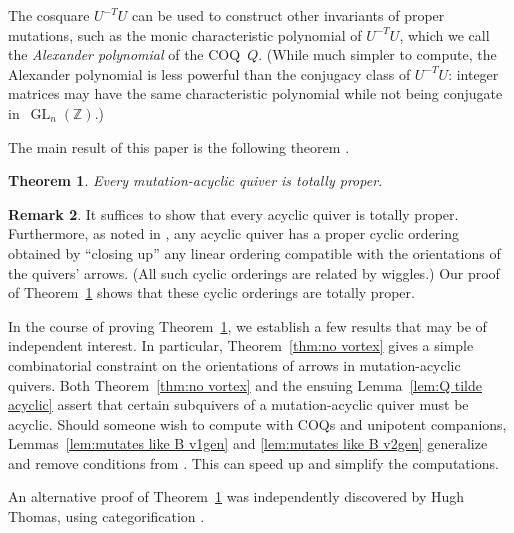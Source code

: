 \documentclass[11pt, letterpaper]{amsart}
\newtheorem{theorem}{Theorem}[section]
\theoremstyle{definition}
\newtheorem{remark}[theorem]{Remark}
\numberwithin{equation}{section}
\def\ZZ{{\mathbb Z}}
\def\GL{{\operatorname{GL}}}
\begin{document}
The cosquare $U^{-T} U$ can be used to construct other invariants of proper mutations, 
such as the monic characteristic polynomial of $U^{-T} U$, 
which we call the \emph{Alexander polynomial} of the COQ~$Q$.
(While much simpler to compute, the Alexander polynomial is less powerful
than the conjugacy class of $U^{-T} U$:
integer matrices may have the same characteristic polynomial while 
not being conjugate in~$\GL_n(\ZZ)$.) 

\pagebreak[2]

The main result of this paper is the following theorem \cite[Conjecture~15.9]{COQ}. %
\begin{theorem}
\label{thm:acyclic totally proper}
Every mutation-acyclic quiver is totally proper. %
\end{theorem}

\begin{remark}
\label{rem:the order}
It suffices to show that every acyclic quiver is totally proper.
Further\-more, as noted in {\cite[Observation~11.6]{COQ}}, any acyclic quiver has a proper cyclic ordering 
obtained by ``closing up'' any linear ordering compatible with the orientations of the quivers' arrows.
(All such cyclic orderings are related by wiggles.)
Our proof of Theorem~\ref{thm:acyclic totally proper} shows that these cyclic orderings are totally proper.
\end{remark}

In the course of proving Theorem~\ref{thm:acyclic totally proper},
we establish a few results that may be of independent interest.
In particular, Theorem~\ref{thm:no vortex} gives a simple combinatorial constraint on the orientations of arrows in mutation-acyclic quivers.
Both Theorem~\ref{thm:no vortex} and the ensuing Lemma~\ref{lem:Q tilde acyclic} assert that certain subquivers of a mutation-acyclic quiver must be acyclic. 
Should someone wish to compute with COQs and unipotent companions, Lemmas~\ref{lem:mutates like B v1gen} and \ref{lem:mutates like B v2gen} generalize and remove conditions from {\cite[Lemma 7.2 and Remark 7.3]{COQ}}.
This can speed up and simplify the computations. %

An alternative proof of Theorem~\ref{thm:acyclic totally proper} was independently discovered by Hugh Thomas, using categorification \cite{HughPC}.
\end{document}
